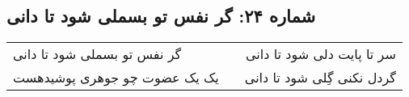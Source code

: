 \begin{center}
\section*{شماره ۲۴: گر نفس تو بسملی شود تا دانی}
\label{sec:024}
\begin{longtable}{l p{0.5cm} r}
گر نفس تو بسملی شود تا دانی
&&
سر تا پایت دلی شود تا دانی
\\
یک یک عضوت چو جوهری پوشیدهست
&&
گردل نکنی گِلی شود تا دانی
\\
\end{longtable}
\end{center}
